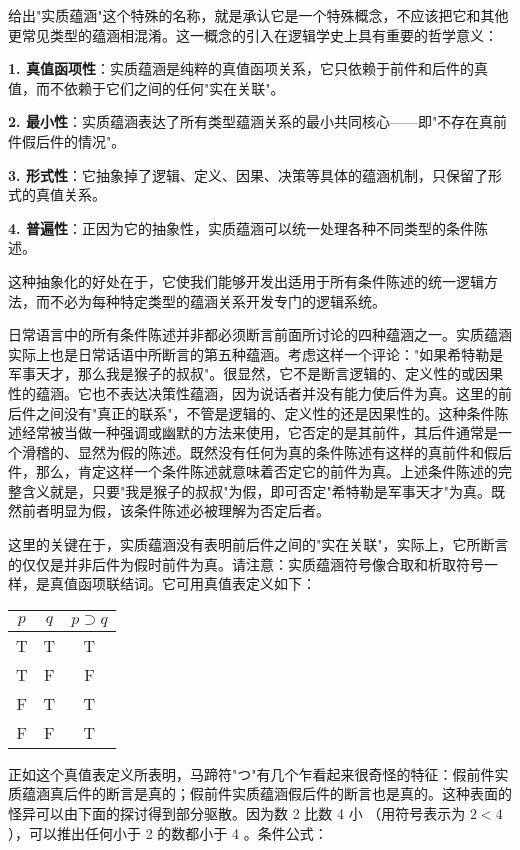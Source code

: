 给出"实质蕴涵"这个特殊的名称，就是承认它是一个特殊概念，不应该把它和其他更常见类型的蕴涵相混淆。这一概念的引入在逻辑学史上具有重要的哲学意义：

\begin{theorembox}[title=实质蕴涵的本质特征]
\textbf{1. 真值函项性}：实质蕴涵是纯粹的真值函项关系，它只依赖于前件和后件的真值，而不依赖于它们之间的任何"实在关联"。

\textbf{2. 最小性}：实质蕴涵表达了所有类型蕴涵关系的最小共同核心——即"不存在真前件假后件的情况"。

\textbf{3. 形式性}：它抽象掉了逻辑、定义、因果、决策等具体的蕴涵机制，只保留了形式的真值关系。

\textbf{4. 普遍性}：正因为它的抽象性，实质蕴涵可以统一处理各种不同类型的条件陈述。
\end{theorembox}

这种抽象化的好处在于，它使我们能够开发出适用于所有条件陈述的统一逻辑方法，而不必为每种特定类型的蕴涵关系开发专门的逻辑系统。

日常语言中的所有条件陈述并非都必须断言前面所讨论的四种蕴涵之一。实质蕴涵实际上也是日常话语中所断言的第五种蕴涵。考虑这样一个评论："如果希特勒是军事天才，那么我是猴子的叔叔"。很显然，它不是断言逻辑的、定义性的或因果性的蕴涵。它也不表达决策性蕴涵，因为说话者并没有能力使后件为真。这里的前后件之间没有"真正的联系"，不管是逻辑的、定义性的还是因果性的。这种条件陈述经常被当做一种强调或幽默的方法来使用，它否定的是其前件，其后件通常是一个滑稽的、显然为假的陈述。既然没有任何为真的条件陈述有这样的真前件和假后件，那么，肯定这样一个条件陈述就意味着否定它的前件为真。上述条件陈述的完整含义就是，只要"我是猴子的叔叔"为假，即可否定"希特勒是军事天才"为真。既然前者明显为假，该条件陈述必被理解为否定后者。

这里的关键在于，实质蕴涵没有表明前后件之间的"实在关联"，实际上，它所断言的仅仅是并非后件为假时前件为真。请注意：实质蕴涵符号像合取和析取符号一样，是真值函项联结词。它可用真值表定义如下：

\begin{center}
\begin{tabular}{|ccc|}
\hline
$p$ & $q$ & $p \supset q$ \\
\hline
T & T & T \\
T & F & F \\
F & T & T \\
F & F & T \\
\hline
\end{tabular}
\end{center}

正如这个真值表定义所表明，马蹄符"つ"有几个乍看起来很奇怪的特征：假前件实质蕴涵真后件的断言是真的；假前件实质蕴涵假后件的断言也是真的。这种表面的怪异可以由下面的探讨得到部分驱散。因为数 2 比数 4 小 （用符号表示为 $2<4$ ），可以推出任何小于 2 的数都小于 4 。条件公式：

